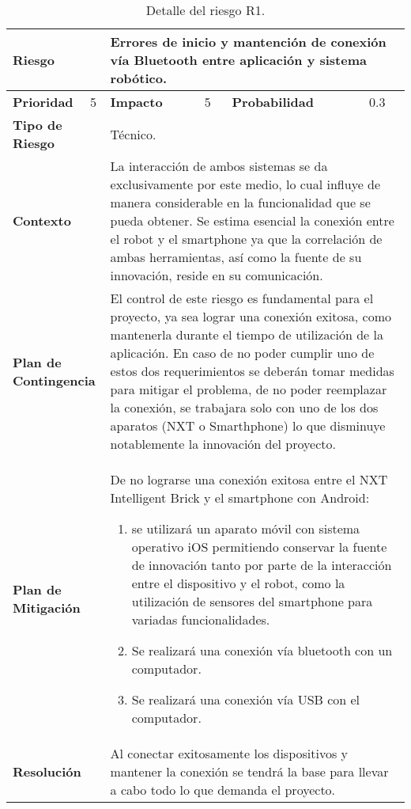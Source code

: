 \begin{table}[htbp!]
  \centering
  \begin{tabular}{|p{4cm}p{1cm}|p{4cm}p{1cm}|p{4cm}p{1cm}|}\hline
    \multicolumn{2}{|p{5cm}}{\bf Riesgo}& \multicolumn{4}{p{11cm}|}{Errores de inicio y mantenci\'on de conexi\'on v\'ia Bluetooth entre aplicaci\'on y sistema rob\'otico.}\\\hline
    {\bf Prioridad}& 5& {\bf Impacto}& 5& {\bf Probabilidad}& 0.3\\\hline
    \multicolumn{2}{|p{5cm}}{\bf Tipo de Riesgo}& \multicolumn{4}{p{11cm}|}{T\'ecnico.}\\\hline
    \multicolumn{2}{|p{5cm}}{\bf Contexto}& \multicolumn{4}{p{11cm}|}{La interacci\'on de ambos sistemas se da exclusivamente por este medio, lo cual influye de manera considerable en la funcionalidad que se pueda obtener.
Se estima esencial la conexi\'on entre el robot y el smartphone ya que la correlaci\'on de ambas herramientas, as\'i como la fuente de su innovaci\'on, reside en su comunicaci\'on.}\\\hline
    \multicolumn{2}{|p{5cm}}{\bf Plan de Contingencia}& \multicolumn{4}{p{11cm}|}{El control de este riesgo es fundamental para el proyecto, ya sea lograr una conexi\'on exitosa, como mantenerla durante el tiempo de utilizaci\'on de la aplicaci\'on.
En caso de no poder cumplir uno de estos dos requerimientos se deber\'an tomar medidas para mitigar el problema, de no poder reemplazar la conexi\'on, se trabajara solo con uno de los dos aparatos (NXT o Smarthphone) lo que disminuye notablemente la innovaci\'on del proyecto.}\\\hline
    \multicolumn{2}{|p{5cm}}{\bf Plan de Mitigaci\'on}& \multicolumn{4}{p{11cm}|}{De no lograrse una conexi\'on exitosa entre el NXT Intelligent Brick y el smartphone con Android:\begin{enumerate}\item se utilizar\'a un aparato m\'ovil con sistema operativo iOS permitiendo conservar la fuente de innovaci\'on tanto por parte de la interacci\'on entre el dispositivo y el robot, como la utilizaci\'on de sensores del smartphone para variadas funcionalidades.\item Se realizar\'a una conexi\'on v\'ia bluetooth con un computador.\item Se realizar\'a una conexi\'on v\'ia USB con el computador.\end{enumerate}}\\\hline
    \multicolumn{2}{|p{5cm}}{\bf Resoluci\'on}& \multicolumn{4}{p{11cm}|}{Al conectar exitosamente los dispositivos y mantener la conexi\'on se tendr\'a la base para llevar a cabo todo lo que demanda el proyecto.}\\\hline
  \end{tabular}
  \caption[Riesgo T\'ecnico - R1]{Detalle del riesgo R1.}
  \label{table:R1}
\end{table}


